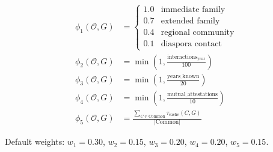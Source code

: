 \documentclass[11pt,a4paper,twocolumn]{article}
\begin{document}
\begin{align}
  \phi_1(\mathcal{O}, G) &= \begin{cases}
    1.0 & \text{immediate family} \\
    0.7 & \text{extended family} \\
    0.4 & \text{regional community} \\
    0.1 & \text{diaspora contact}
  \end{cases} \\
  \phi_2(\mathcal{O}, G) &= \min\left(1, \frac{\text{interactions}_{\text{year}}}{100}\right) \\
  \phi_3(\mathcal{O}, G) &= \min\left(1, \frac{\text{years\_known}}{20}\right) \\
  \phi_4(\mathcal{O}, G) &= \min\left(1, \frac{\text{mutual\_attestations}}{10}\right) \\
  \phi_5(\mathcal{O}, G) &= \frac{\sum_{C \in \text{Common}} \tau_{\text{cache}}(C, G)}{|\text{Common}|}
\end{align}

Default weights: $w_1 = 0.30$, $w_2 = 0.15$, $w_3 = 0.20$, $w_4 = 0.20$, $w_5 = 0.15$.
\end{document}
